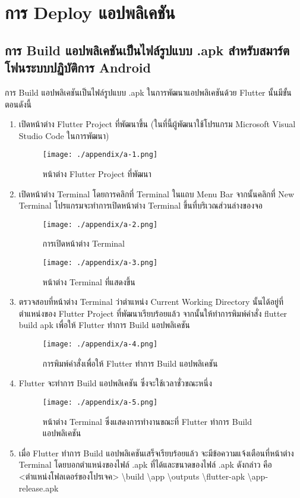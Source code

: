\StartAppendix
\chapter{การ Deploy แอปพลิเคชัน}
\section{การ Build แอปพลิเคชันเป็นไฟล์รูปแบบ .apk สำหรับสมาร์ตโฟนระบบปฏิบัติการ Android}
การ Build แอปพลิเคชันเป็นไฟล์รูปแบบ .apk ในการพัฒนาแอปพลิเคชันด้วย Flutter นั้นมีขั้นตอนดังนี้
\begin{enumerate}
    \item เปิดหน้าต่าง Flutter Project ที่พัฒนาขึ้น (ในที่นี้ผู้พัฒนาใช้โปรแกรม Microsoft Visual Studio Code ในการพัฒนา)
    \begin{figure}
        \texttt{[image: ./appendix/a-1.png]}
        \caption{หน้าต่าง Flutter Project ที่พัฒนา}
    \end{figure}
    \item เปิดหน้าต่าง Terminal โดยการคลิกที่ Terminal ในแถบ Menu Bar จากนั้นคลิกที่ New Terminal โปรแกรมจะทำการเปิดหน้าต่าง Terminal ขึ้นที่บริเวณส่วนล่างของจอ
    \begin{figure}
        \texttt{[image: ./appendix/a-2.png]}
        \caption{การเปิดหน้าต่าง Terminal}
    \end{figure}
    \begin{figure}
        \texttt{[image: ./appendix/a-3.png]}
        \caption{หน้าต่าง Terminal ที่แสดงขึ้น}
    \end{figure}
    \item ตรวจสอบที่หน้าต่าง Terminal ว่าตำแหน่ง Current Working Directory นั้นได้อยู่ที่ตำแหน่งของ Flutter Project ที่พัฒนาเรียบร้อยแล้ว จากนั้นให้ทำการพิมพ์คำสั่ง flutter build apk เพื่อให้ Flutter ทำการ Build แอปพลิเคชัน
    \begin{figure}
        \texttt{[image: ./appendix/a-4.png]}
        \caption{การพิมพ์คำสั่งเพื่อให้ Flutter ทำการ Build แอปพลิเคชัน}
    \end{figure}
    \item Flutter จะทำการ Build แอปพลิเคชัน ซึ่งจะใช้เวลาชั่วขณะหนึ่ง
    \begin{figure}
        \texttt{[image: ./appendix/a-5.png]}
        \caption{หน้าต่าง Terminal ซึ่งแสดงการทำงานขณะที่ Flutter ทำการ Build แอปพลิเคชัน}
    \end{figure}
    \item เมื่อ Flutter ทำการ Build แอปพลิเคชันเสร็จเรียบร้อยแล้ว จะมีข้อความแจ้งเตือนที่หน้าต่าง Terminal โดยบอกตำแหน่งของไฟล์ .apk ที่ได้และขนาดของไฟล์ .apk ดังกล่าว คือ <ตำแหน่งโฟลเดอร์ของโปรเจค> \textbackslash build \textbackslash app \textbackslash outputs \textbackslash flutter-apk \textbackslash app-release.apk

\end{enumerate}
